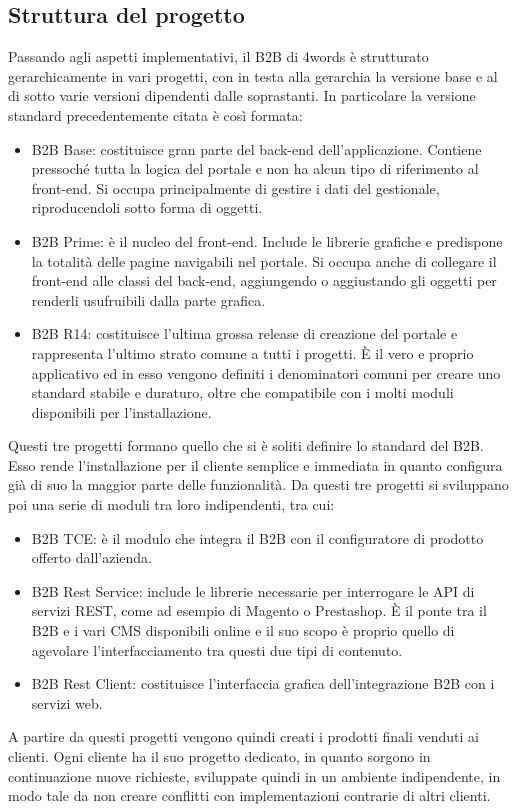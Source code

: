 \subsection{Struttura del progetto}
Passando agli aspetti implementativi, il B2B di 4words è strutturato gerarchicamente in vari progetti, con in testa alla gerarchia la versione base e al di sotto varie versioni dipendenti dalle soprastanti. In particolare la versione standard precedentemente citata è così formata:
\begin{itemize}
	\item B2B Base: costituisce gran parte del back-end dell'applicazione. Contiene pressoché tutta la logica del portale e non ha alcun tipo di riferimento al front-end. Si occupa principalmente di gestire i dati del gestionale, riproducendoli sotto forma di oggetti.
	\item B2B Prime: è il nucleo del front-end. Include le librerie grafiche e predispone la totalità delle pagine navigabili nel portale. Si occupa anche di collegare il front-end alle classi del back-end, aggiungendo o aggiustando gli oggetti per renderli usufruibili dalla parte grafica.
	\item B2B R14: costituisce l'ultima grossa release di creazione del portale e rappresenta l'ultimo strato comune a tutti i progetti. È il vero e proprio applicativo ed in esso vengono definiti i denominatori comuni per creare uno standard stabile e duraturo, oltre che compatibile con i molti moduli disponibili per l'installazione.
\end{itemize}
Questi tre progetti formano quello che si è soliti definire lo standard del B2B. Esso rende l'installazione per il cliente semplice e immediata in quanto configura già di suo la maggior parte delle funzionalità.
Da questi tre progetti si sviluppano poi una serie di moduli tra loro indipendenti, tra cui:
\begin{itemize}
	\item B2B TCE: è il modulo che integra il B2B con il configuratore di prodotto offerto dall'azienda.
	\item B2B Rest Service: include le librerie necessarie per interrogare le \Gls{API} di servizi \Gls{REST}, come ad esempio di \Gls{Magento} o \Gls{Prestashop}. È il ponte tra il B2B e i vari \Gls{CMS} disponibili online e il suo scopo è proprio quello di agevolare l'interfacciamento tra questi due tipi di contenuto.
	\item B2B Rest Client: costituisce l'interfaccia grafica dell'integrazione B2B con i servizi web.
\end{itemize}
A partire da questi progetti vengono quindi creati i prodotti finali venduti ai clienti. Ogni cliente ha il suo progetto dedicato, in quanto sorgono in continuazione nuove richieste, sviluppate quindi in un ambiente indipendente, in modo tale da non creare conflitti con implementazioni contrarie di altri clienti.

